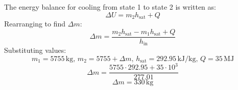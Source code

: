 The energy balance for cooling from state 1 to state 2 is written as:  
\[
\Delta U = m_2 h_{\text{sat}} + Q
\]  
Rearranging to find \( \Delta m \):  
\[
\Delta m = \frac{m_2 h_{\text{sat}} - m_1 h_{\text{sat}} + Q}{h_{\text{in}}}
\]  
Substituting values:  
\[
m_1 = 5755 \, \text{kg}, \, m_2 = 5755 + \Delta m, \, h_{\text{sat}} = 292.95 \, \text{kJ/kg}, \, Q = 35 \, \text{MJ}
\]  
\[
\Delta m = \frac{5755 \cdot 292.95 + 35 \cdot 10^3}{277.01}
\]  
\[
\Delta m = 330 \, \text{kg}
\]
